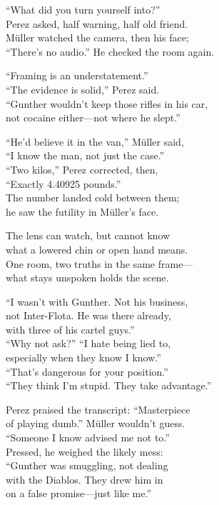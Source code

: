 \begin{lyrics}
“What did you turn yourself into?”\\
Perez asked, half warning, half old friend.\\
Müller watched the camera, then his face;\\
“There's no audio.” He checked the room again.

“Framing is an understatement.”\\
“The evidence is solid,” Perez said.\\
“Gunther wouldn’t keep those rifles in his car,\\
not cocaine either—not where he slept.”

“He’d believe it in the van,” Müller said,\\
“I know the man, not just the case.”\\
“Two kilos,” Perez corrected, then,\\
“Exactly 4.40925 pounds.”\\
The number landed cold between them;\\
he saw the futility in Müller’s face.

The lens can watch, but cannot know\\
what a lowered chin or open hand means.\\
One room, two truths in the same frame—\\
what stays unspoken holds the scene.

“I wasn’t with Gunther. Not his business,\\
not Inter-Flota. He was there already,\\
with three of his cartel guys.”\\
“Why not ask?” “I hate being lied to,\\
especially when they know I know.”\\
“That’s dangerous for your position.”\\
“They think I’m stupid. They take advantage.”

Perez praised the transcript: “Masterpiece\\
of playing dumb.” Müller wouldn’t guess.\\
“Someone I know advised me not to.”\\
Pressed, he weighed the likely mess:\\
“Gunther was smuggling, not dealing\\
with the Diablos. They drew him in\\
on a false promise—just like me.”


\end{lyrics}
